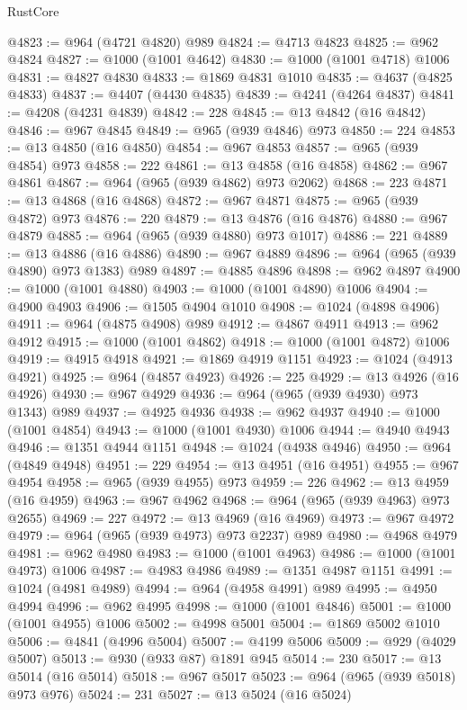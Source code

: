 \begin{lexlean}{RustCore}
\begin{coremodule}
@4823 := @964 (@4721 @4820) @989
@4824 := @4713 @4823
@4825 := @962 @4824
@4827 := @1000 (@1001 @4642)
@4830 := @1000 (@1001 @4718) @1006
@4831 := @4827 @4830
@4833 := @1869 @4831 @1010
@4835 := @4637 (@4825 @4833)
@4837 := @4407 (@4430 @4835)
@4839 := @4241 (@4264 @4837)
@4841 := @4208 (@4231 @4839)
@4842 := 228
@4845 := @13 @4842 (@16 @4842)
@4846 := @967 @4845
@4849 := @965 (@939 @4846) @973
@4850 := 224
@4853 := @13 @4850 (@16 @4850)
@4854 := @967 @4853
@4857 := @965 (@939 @4854) @973
@4858 := 222
@4861 := @13 @4858 (@16 @4858)
@4862 := @967 @4861
@4867 := @964 (@965 (@939 @4862) @973 @2062)
@4868 := 223
@4871 := @13 @4868 (@16 @4868)
@4872 := @967 @4871
@4875 := @965 (@939 @4872) @973
@4876 := 220
@4879 := @13 @4876 (@16 @4876)
@4880 := @967 @4879
@4885 := @964 (@965 (@939 @4880) @973 @1017)
@4886 := 221
@4889 := @13 @4886 (@16 @4886)
@4890 := @967 @4889
@4896 := @964 (@965 (@939 @4890) @973 @1383) @989
@4897 := @4885 @4896
@4898 := @962 @4897
@4900 := @1000 (@1001 @4880)
@4903 := @1000 (@1001 @4890) @1006
@4904 := @4900 @4903
@4906 := @1505 @4904 @1010
@4908 := @1024 (@4898 @4906)
@4911 := @964 (@4875 @4908) @989
@4912 := @4867 @4911
@4913 := @962 @4912
@4915 := @1000 (@1001 @4862)
@4918 := @1000 (@1001 @4872) @1006
@4919 := @4915 @4918
@4921 := @1869 @4919 @1151
@4923 := @1024 (@4913 @4921)
@4925 := @964 (@4857 @4923)
@4926 := 225
@4929 := @13 @4926 (@16 @4926)
@4930 := @967 @4929
@4936 := @964 (@965 (@939 @4930) @973 @1343) @989
@4937 := @4925 @4936
@4938 := @962 @4937
@4940 := @1000 (@1001 @4854)
@4943 := @1000 (@1001 @4930) @1006
@4944 := @4940 @4943
@4946 := @1351 @4944 @1151
@4948 := @1024 (@4938 @4946)
@4950 := @964 (@4849 @4948)
@4951 := 229
@4954 := @13 @4951 (@16 @4951)
@4955 := @967 @4954
@4958 := @965 (@939 @4955) @973
@4959 := 226
@4962 := @13 @4959 (@16 @4959)
@4963 := @967 @4962
@4968 := @964 (@965 (@939 @4963) @973 @2655)
@4969 := 227
@4972 := @13 @4969 (@16 @4969)
@4973 := @967 @4972
@4979 := @964 (@965 (@939 @4973) @973 @2237) @989
@4980 := @4968 @4979
@4981 := @962 @4980
@4983 := @1000 (@1001 @4963)
@4986 := @1000 (@1001 @4973) @1006
@4987 := @4983 @4986
@4989 := @1351 @4987 @1151
@4991 := @1024 (@4981 @4989)
@4994 := @964 (@4958 @4991) @989
@4995 := @4950 @4994
@4996 := @962 @4995
@4998 := @1000 (@1001 @4846)
@5001 := @1000 (@1001 @4955) @1006
@5002 := @4998 @5001
@5004 := @1869 @5002 @1010
@5006 := @4841 (@4996 @5004)
@5007 := @4199 @5006
@5009 := @929 (@4029 @5007)
@5013 := @930 (@933 @87) @1891 @945
@5014 := 230
@5017 := @13 @5014 (@16 @5014)
@5018 := @967 @5017
@5023 := @964 (@965 (@939 @5018) @973 @976)
@5024 := 231
@5027 := @13 @5024 (@16 @5024)

\end{coremodule}
\end{lexlean}
